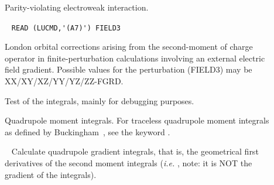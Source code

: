 \begin{description}
\item[] Parity-violating electroweak interaction.


\item[]\verb| |\newline
\verb|READ (LUCMD,'(A7)') FIELD3|

London orbital corrections arising from the second-moment of charge
operator in finite-perturbation calculations involving an external
electric field gradient. Possible values for the perturbation (FIELD3)
may be XX/XY/XZ/YY/YZ/ZZ-FGRD.


\item[] Test of the  integrals, mainly for
  debugging purposes.

\item[] Quadrupole moment integrals.
For traceless quadrupole moment integrals as
defined by Buckingham~\cite{adbacp12}, see the keyword .


\item[]\verb| |\newline
Calculate quadrupole gradient integrals, that is, the geometrical first
derivatives of the second moment integrals
({\it i.e.\/} , note: it is NOT the gradient of the  integrals).


\end{description}
